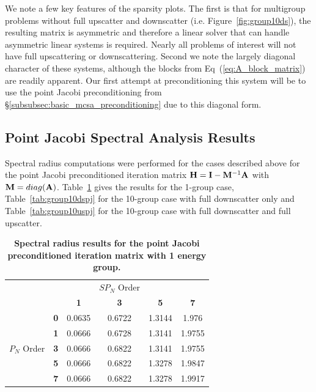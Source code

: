 We note a few key features of the sparsity plots. The first is that
for multigroup problems without full upscatter and downscatter
(i.e. Figure~\ref{fig:group10ds}), the resulting matrix is asymmetric
and therefore a linear solver that can handle asymmetric linear
systems is required. Nearly all problems of interest will not have
full upscattering or downscattering. Second we note the largely
diagonal character of these systems, although the blocks from
Eq~(\ref{eq:A_block_matrix}) are readily apparent. Our first attempt
at preconditioning this system will be to use the point Jacobi
preconditioning from \S\ref{subsubsec:basic_mcsa_preconditioning} due
to this diagonal form.

\clearpage

\subsection{Point Jacobi Spectral Analysis Results}
\label{subsec:spn_analysis_results}
Spectral radius computations were performed for the cases described
above for the point Jacobi preconditioned iteration matrix $\mathbf{H} =
\mathbf{I}-\mathbf{M}^{-1}\mathbf{A}$ with $\mathbf{M} =
diag(\mathbf{A})$. Table~\ref{tab:group1pj} gives the results for the
1-group case, Table~\ref{tab:group10dspj} for the 10-group case with
full downscatter only and Table~\ref{tab:group10uspj} for the 10-group
case with full downscatter and full upscatter.
\begin{table}[h!]
  \begin{center}
    \begin{tabular}{cccccc}\hline\hline
      \multicolumn{1}{c}{}& 
      \multicolumn{1}{c}{}& 
      \multicolumn{1}{c}{}& 
      \multicolumn{1}{c}{$SP_N$ Order}& 
      \multicolumn{1}{c}{}& 
      \multicolumn{1}{c}{} \\
       &   & \textbf{1} & \textbf{3} & \textbf{5} & \textbf{7}  \\
       & \textbf{0} & 0.0635 & 0.6722 & 1.3144 & 1.976 \\
       & \textbf{1} & 0.0666 & 0.6728 & 1.3141 & 1.9755 \\
      $P_N$ Order & \textbf{3} & 0.0666 & 0.6822 & 1.3141 & 1.9755 \\
       & \textbf{5} & 0.0666 & 0.6822 & 1.3278 & 1.9847 \\
       & \textbf{7} & 0.0666 & 0.6822 & 1.3278 & 1.9917 \\
      \hline\hline
    \end{tabular}
  \end{center}
  \caption{\textbf{Spectral radius results for the point Jacobi
      preconditioned iteration matrix with 1 energy group.}}
  \label{tab:group1pj}
\end{table}

